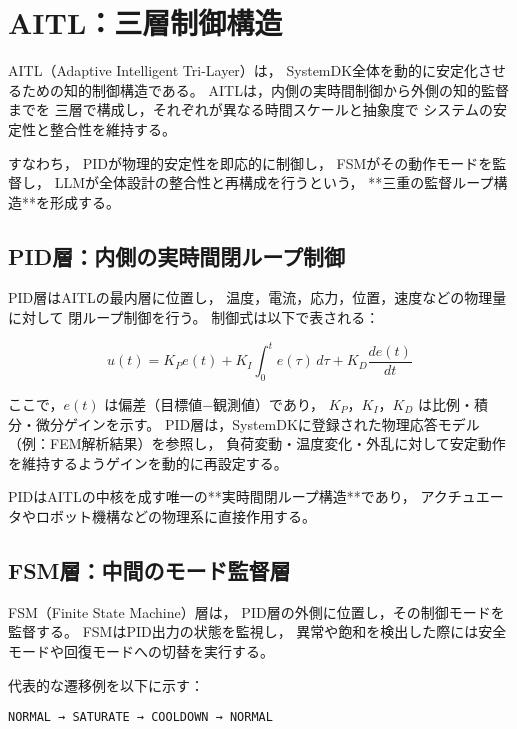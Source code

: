 \section{AITL：三層制御構造}

AITL（Adaptive Intelligent Tri-Layer）は，
SystemDK全体を動的に安定化させるための知的制御構造である。
AITLは，内側の実時間制御から外側の知的監督までを
三層で構成し，それぞれが異なる時間スケールと抽象度で
システムの安定性と整合性を維持する。

すなわち，
PIDが物理的安定性を即応的に制御し，
FSMがその動作モードを監督し，
LLMが全体設計の整合性と再構成を行うという，
**三重の監督ループ構造**を形成する。

\subsection{PID層：内側の実時間閉ループ制御}
PID層はAITLの最内層に位置し，
温度，電流，応力，位置，速度などの物理量に対して
閉ループ制御を行う。
制御式は以下で表される：

\begin{equation}
u(t) = K_P e(t) + K_I \int_{0}^{t} e(\tau)\,d\tau + K_D \frac{de(t)}{dt}
\end{equation}

ここで，$e(t)$ は偏差（目標値−観測値）であり，
$K_P$，$K_I$，$K_D$ は比例・積分・微分ゲインを示す。
PID層は，SystemDKに登録された物理応答モデル（例：FEM解析結果）を参照し，
負荷変動・温度変化・外乱に対して安定動作を維持するようゲインを動的に再設定する。

PIDはAITLの中核を成す唯一の**実時間閉ループ構造**であり，
アクチュエータやロボット機構などの物理系に直接作用する。

\subsection{FSM層：中間のモード監督層}
FSM（Finite State Machine）層は，
PID層の外側に位置し，その制御モードを監督する。
FSMはPID出力の状態を監視し，
異常や飽和を検出した際には安全モードや回復モードへの切替を実行する。

代表的な遷移例を以下に示す：

\begin{center}
\texttt{NORMAL → SATURATE → COOLDOWN → NORMAL}
\end{center}

